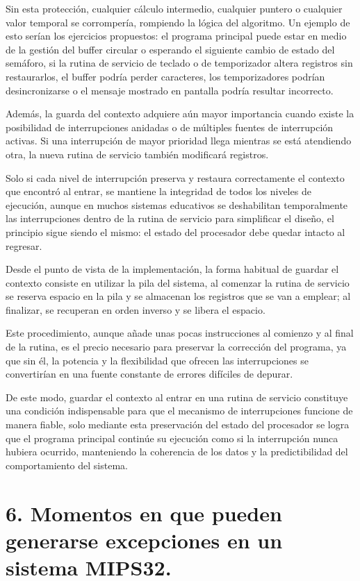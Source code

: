 \documentclass[12pt, letterpaper]{article}
\begin{document}
Sin esta protección, cualquier cálculo intermedio, cualquier puntero o cualquier valor temporal se corrompería, rompiendo la lógica del algoritmo. Un ejemplo de esto serían los ejercicios propuestos: el programa principal puede estar en medio de la gestión del buffer circular o esperando el siguiente cambio de estado del semáforo, si la rutina de servicio de teclado o de temporizador altera registros sin restaurarlos, el buffer podría perder caracteres, los temporizadores podrían desincronizarse o el mensaje mostrado en pantalla podría resultar incorrecto.

Además, la guarda del contexto adquiere aún mayor importancia cuando existe la posibilidad de interrupciones anidadas o de múltiples fuentes de interrupción activas. Si una interrupción de mayor prioridad llega mientras se está atendiendo otra, la nueva rutina de servicio también modificará registros.

Solo si cada nivel de interrupción preserva y restaura correctamente el contexto que encontró al entrar, se mantiene la integridad de todos los niveles de ejecución, aunque en muchos sistemas educativos se deshabilitan temporalmente las interrupciones dentro de la rutina de servicio para simplificar el diseño, el principio sigue siendo el mismo: el estado del procesador debe quedar intacto al regresar.

Desde el punto de vista de la implementación, la forma habitual de guardar el contexto consiste en utilizar la pila del sistema, al comenzar la rutina de servicio se reserva espacio en la pila y se almacenan los registros que se van a emplear; al finalizar, se recuperan en orden inverso y se libera el espacio.

Este procedimiento, aunque añade unas pocas instrucciones al comienzo y al final de la rutina, es el precio necesario para preservar la corrección del programa, ya que sin él, la potencia y la flexibilidad que ofrecen las interrupciones se convertirían en una fuente constante de errores difíciles de depurar.

De este modo, guardar el contexto al entrar en una rutina de servicio constituye una condición indispensable para que el mecanismo de interrupciones funcione de manera fiable, solo mediante esta preservación del estado del procesador se logra que el programa principal continúe su ejecución como si la interrupción nunca hubiera ocurrido, manteniendo la coherencia de los datos y la predictibilidad del comportamiento del sistema.\newpage

\section*{\textbf{6. Momentos en que pueden generarse excepciones en un sistema MIPS32.}}
\end{document}
